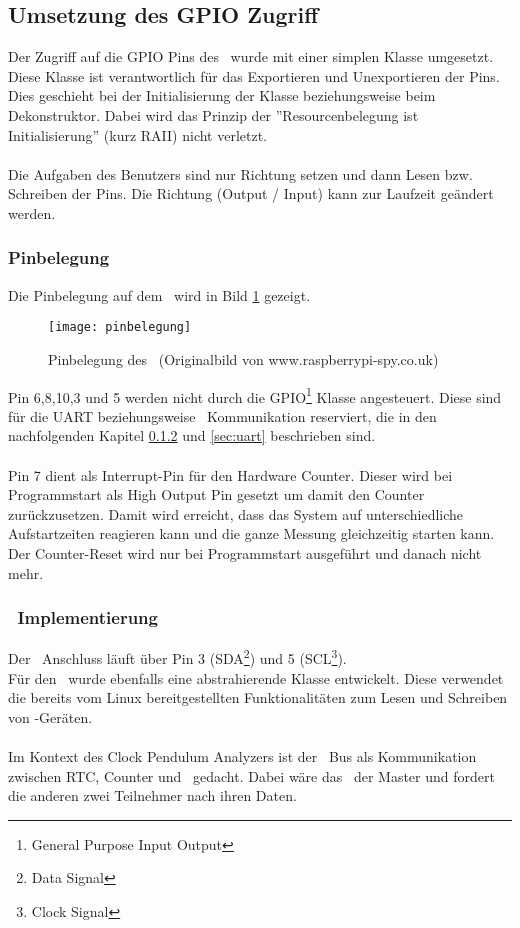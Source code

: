 \subsection{Umsetzung des GPIO Zugriff}
Der Zugriff auf die GPIO Pins des \rpi\ wurde mit einer simplen Klasse umgesetzt. Diese Klasse ist verantwortlich für das Exportieren und Unexportieren der Pins.
Dies geschieht bei der Initialisierung der Klasse beziehungsweise beim Dekonstruktor. Dabei wird das Prinzip der ''Resourcenbelegung ist Initialisierung'' (kurz RAII) nicht verletzt.\\
\\
Die Aufgaben des Benutzers sind nur Richtung setzen und dann Lesen bzw. Schreiben der Pins. Die Richtung (Output / Input) kann zur Laufzeit geändert werden.

\subsubsection{Pinbelegung}
Die Pinbelegung auf dem \rpi\ wird in Bild \ref{fig:pi_belegung} gezeigt.
\begin{figure}[H]
    \centering
    \texttt{[image: pinbelegung]}
    \caption{Pinbelegung des \rpi\ (Originalbild von www.raspberrypi-spy.co.uk)}
    \label{fig:pi_belegung}
\end{figure}

\noindent Pin 6,8,10,3 und 5 werden nicht durch die GPIO\footnote{General Purpose Input Output} Klasse angesteuert. Diese sind für die UART beziehungsweise \iic\ Kommunikation reserviert, die in den nachfolgenden Kapitel \ref{sec:i2c} und \ref{sec:uart} beschrieben sind.\\\\
Pin 7 dient als Interrupt-Pin für den Hardware Counter. Dieser wird bei Programmstart als High Output Pin gesetzt um damit den Counter zurückzusetzen. Damit wird erreicht, dass das System auf unterschiedliche Aufstartzeiten reagieren kann und die ganze Messung gleichzeitig starten kann. Der Counter-Reset wird nur bei Programmstart ausgeführt und danach nicht mehr.

\subsubsection{\iic\ Implementierung}\label{sec:i2c}
Der \iic\ Anschluss läuft über Pin 3 (SDA\footnote{Data Signal}) und 5 (SCL\footnote{Clock Signal}).\\
Für den \iic\ wurde ebenfalls eine abstrahierende Klasse entwickelt. Diese verwendet die bereits vom Linux bereitgestellten Funktionalitäten zum Lesen und Schreiben von \iic-Geräten.\\
\\
Im Kontext des Clock Pendulum Analyzers ist der \iic\ Bus als Kommunikation zwischen RTC, Counter und \rpi\ gedacht. 
Dabei wäre das \rpi\ der Master und fordert die anderen zwei Teilnehmer nach ihren Daten.

